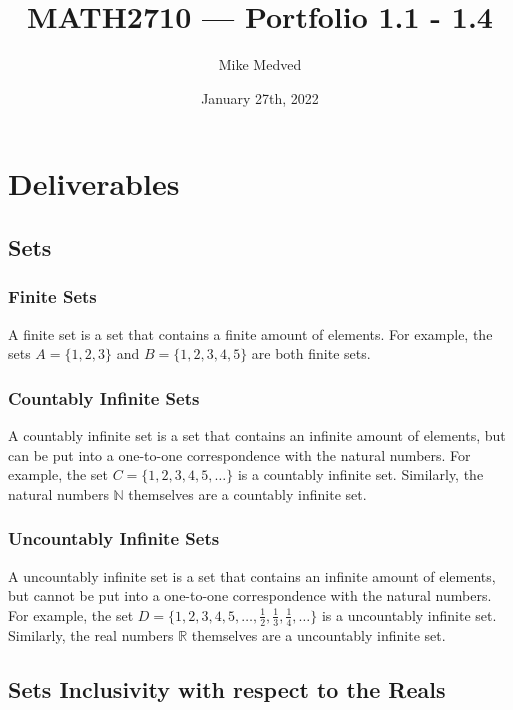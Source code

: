 \documentclass{article}
\title{MATH2710 — Portfolio 1.1 - 1.4}
\author{Mike Medved}
\date{January 27th, 2022}
\begin{document}
\maketitle

\section{Deliverables}

\subsection{Sets}

\subsubsection{Finite Sets}

A finite set is a set that contains a finite amount of elements. For example, the sets $A = \{1, 2, 3\}$ and $B = \{1, 2, 3, 4, 5\}$ are both finite sets.

\subsubsection{Countably Infinite Sets}

A countably infinite set is a set that contains an infinite amount of elements, but can be put into a one-to-one correspondence with the natural numbers. For example, the set $C = \{1, 2, 3, 4, 5, \ldots\}$ is a countably infinite set. Similarly, the natural numbers $\mathbb{N}$ themselves are a countably infinite set.

\subsubsection{Uncountably Infinite Sets}

A uncountably infinite set is a set that contains an infinite amount of elements, but cannot be put into a one-to-one correspondence with the natural numbers. For example, the set $D = \{1, 2, 3, 4, 5, \ldots, \frac{1}{2}, \frac{1}{3}, \frac{1}{4}, \ldots\}$ is a uncountably infinite set. Similarly, the real numbers $\mathbb{R}$ themselves are a uncountably infinite set.

\subsection{Sets Inclusivity with respect to the Reals}
\end{document}
